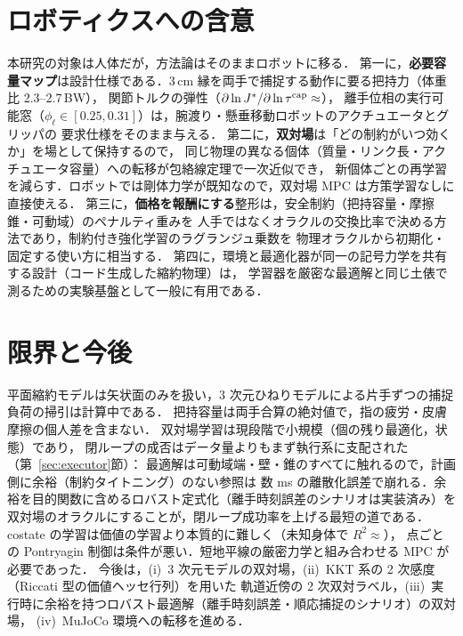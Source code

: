 \section{ロボティクスへの含意}
\label{sec:robotics}
本研究の対象は人体だが，方法論はそのままロボットに移る．
第一に，\textbf{必要容量マップ}は設計仕様である．3\,cm 縁を両手で捕捉する動作に要る把持力（体重比 2.3--2.7\,BW），
関節トルクの弾性（$\partial\ln J^*/\partial\ln\tau^{\rm cap}\approx$\elastTau），
離手位相の実行可能窓（$\phi_\ell\in[0.25,0.31]$）は，腕渡り・懸垂移動ロボットのアクチュエータとグリッパの
要求仕様をそのまま与える．
第二に，\textbf{双対場}は「どの制約がいつ効くか」を場として保持するので，
同じ物理の異なる個体（質量・リンク長・アクチュエータ容量）への転移が包絡線定理で一次近似でき，
新個体ごとの再学習を減らす．ロボットでは剛体力学が既知なので，双対場 MPC は方策学習なしに直接使える．
第三に，\textbf{価格を報酬にする}整形は，安全制約（把持容量・摩擦錐・可動域）のペナルティ重みを
人手ではなくオラクルの交換比率で決める方法であり，制約付き強化学習のラグランジュ乗数を
物理オラクルから初期化・固定する使い方に相当する．
第四に，環境と最適化器が同一の記号力学を共有する設計（コード生成した縮約物理）は，
学習器を厳密な最適解と同じ土俵で測るための実験基盤として一般に有用である．

\section{限界と今後}
\label{sec:limits}
平面縮約モデルは矢状面のみを扱い，3 次元ひねりモデルによる片手ずつの捕捉負荷の掃引は計算中である．
把持容量は両手合算の絶対値で，指の疲労・皮膚摩擦の個人差を含まない．
双対場学習は現段階で小規模（\dflNok 個の残り最適化，\dflNrows 状態）であり，
閉ループの成否はデータ量よりもまず執行系に支配された（第~\ref{sec:executor}節）：
最適解は可動域端・壁・錐のすべてに触れるので，計画側に余裕（制約タイトニング）のない参照は
数 ms の離散化誤差で崩れる．余裕を目的関数に含めるロバスト定式化（離手時刻誤差のシナリオは実装済み）を
双対場のオラクルにすることが，閉ループ成功率を上げる最短の道である．
costate の学習は価値の学習より本質的に難しく（未知身体で $R^2\approx$\fitPhold），
点ごとの Pontryagin 制御は条件が悪い．短地平線の厳密力学と組み合わせる MPC が必要であった．
今後は，(i)~3 次元モデルの双対場，(ii)~KKT 系の 2 次感度（Riccati 型の価値ヘッセ行列）を用いた
軌道近傍の 2 次双対ラベル，(iii)~実行時に余裕を持つロバスト最適解（離手時刻誤差・順応捕捉のシナリオ）の双対場，
(iv)~MuJoCo 環境への転移を進める．
